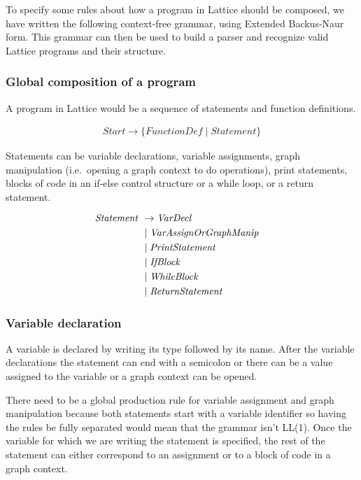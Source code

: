 To specify some rules about how a program in Lattice should be composed, we have written the following context-free grammar, using Extended Backus-Naur form.
This grammar can then be used to build a parser and recognize valid Lattice programs and their structure.

\subsubsection*{Global composition of a program}

A program in Lattice would be a sequence of statements and function definitions.

\begin{align*}
    \mathit{Start} \rightarrow \{ \mathit{FunctionDef} \mid \mathit{Statement} \}
\end{align*}

Statements can be variable declarations, variable assignments, graph manipulation (i.e.\ opening a graph context to do operations), print statements, blocks of code in an if-else control structure or a while loop, or a return statement.

\begin{align*}
    \omit $\mathit{Statement}$ \hfil& \rightarrow \mathit{VarDecl} \\
    & \mid \mathit{VarAssignOrGraphManip} \\
    & \mid \mathit{PrintStatement} \\
    & \mid \mathit{IfBlock} \\
    & \mid \mathit{WhileBlock} \\
    & \mid \mathit{ReturnStatement}
\end{align*}

\subsubsection*{Variable declaration}

A variable is declared by writing its type followed by its name.
After the variable declarations the statement can end with a semicolon or there can be a value assigned to the variable or a graph context can be opened.

There need to be a global production rule for variable assignment and graph manipulation because both statements start with a variable identifier so having the rules be fully separated would mean that the grammar isn't LL(1).
Once the variable for which we are writing the statement is specified, the rest of the statement can either correspond to an assignment or to a block of code in a graph context.

